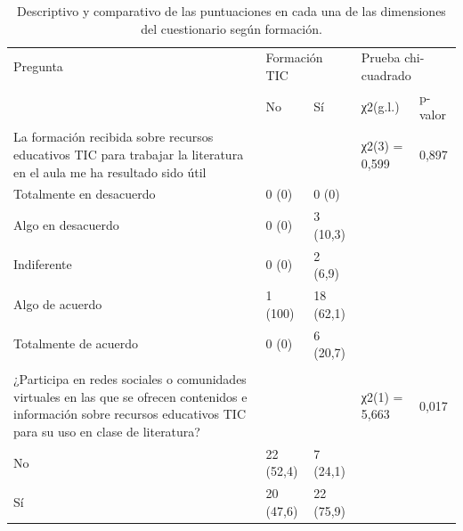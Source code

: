 \documentclass[spanish]{textolivre}
\begin{document}
\begin{table}[htbp]
\caption{Descriptivo y comparativo de las puntuaciones en cada una de las dimensiones del cuestionario según formación.}
\label{tbl03}
\centering
\begin{tabular}{p{}llll}
\toprule
Pregunta & \multicolumn{2}{l}{Formación TIC} & \multicolumn{2}{l}{Prueba chi-cuadrado} \\
 & No & Sí & χ2(g.l.) & p-valor \\
\midrule
La formación recibida sobre recursos educativos TIC para trabajar la literatura en el aula me ha resultado sido útil & & & χ2(3) = 0,599 & 0,897 \\
\hspace{3ex} Totalmente en desacuerdo & 0 (0) & 0 (0) & & \\
\hspace{3ex} Algo en desacuerdo & 0 (0) & 3 (10,3) & & \\
\hspace{3ex} Indiferente & 0 (0) & 2 (6,9) & & \\
\hspace{3ex} Algo de acuerdo & 1 (100) & 18 (62,1) & & \\
\hspace{3ex} Totalmente de acuerdo & 0 (0) & 6 (20,7) & & \\
\\
¿Participa en redes sociales o comunidades virtuales en las que se ofrecen contenidos e información sobre recursos educativos TIC para su uso en clase de literatura? & & & χ2(1) = 5,663 & 0,017 \\
\hspace{3ex} No & 22 (52,4) & 7 (24,1) & & \\
\hspace{3ex} Sí & 20 (47,6) & 22 (75,9) & & \\
\bottomrule
\end{tabular}
\end{table}
\end{document}
